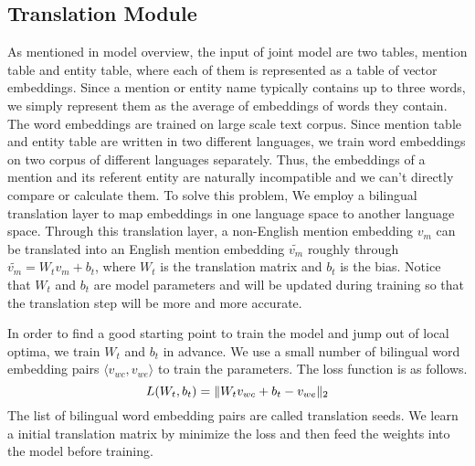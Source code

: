 \subsection{Translation Module}
\label{sec:translation}

As mentioned in model overview, the input of joint model are two tables, mention table and entity table, where each of them is represented as a table of vector embeddings. Since a mention or entity name typically contains up to three words, we simply represent them as the average of embeddings of words they contain. The word embeddings are trained on large scale text corpus. Since mention table and entity table are written in two different languages, we train word embeddings on two corpus of different languages separately. Thus, the embeddings of a mention and its referent entity are naturally incompatible and we can't directly compare or calculate them. To solve this problem, We employ a bilingual translation layer to map embeddings in one language space to another language space. Through this translation layer, a non-English mention embedding $v_m$ can be translated into an English mention embedding $\widetilde{v_{m}}$ roughly through $\widetilde{v_m} = W_{t} v_m + b_{t}$, where $W_{t}$ is the translation matrix and $b_{t}$ is the bias. Notice that $W_{t}$ and $b_{t}$ are model parameters and will be updated during training so that the translation step will be more and more accurate.

In order to find a good starting point to train the model and jump out of local optima, we train $W_{t}$ and $b_{t}$ in advance. We use a small number of bilingual word embedding pairs $\langle v_{wc}, v_{we} \rangle$ to train the parameters. The loss function is as follows.
\begin{equation}
\label{eqn:translation}
L(W_{t}, b_{t}) = \Arrowvert W_{t} v_{wc} + b_{t} - v_{we} \Arrowvert_2
\end{equation}
The list of bilingual word embedding pairs are called translation seeds. We learn a initial translation matrix by minimize the loss and then feed the weights into the model before training.